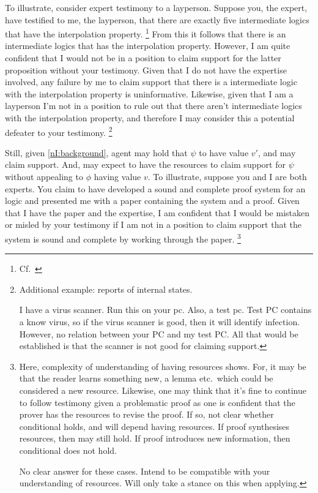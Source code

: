 \begin{note}
  To illustrate, consider expert testimony to a layperson.
  Suppose you, the expert, have testified to me, the layperson, that there are exactly five intermediate logics that have the interpolation property.\nolinebreak
  \footnote{Cf.\ \textcite{Maksimova:1977un}}
  From this it follows that there is an intermediate logics that has the interpolation property.
  However, I am quite confident that I would not be in a position to claim support for the latter proposition without your testimony.
  Given that I do not have the expertise involved, any failure by me to claim support that there is a intermediate logic with the interpolation property is uninformative.
  Likewise, given that I am a layperson I'm not in a position to rule out that there aren't intermediate logics with the interpolation property, and therefore I may consider this a potential defeater to your testimony.\nolinebreak
  \footnote{
    Additional example: reports of internal states.

    I have a virus scanner.
    Run this on your pc.
    Also, a test pc.
    Test PC contains a know virus, so if the virus scanner is good, then it will identify infection.
    However, no relation between your PC and my test PC.
    All that would be established is that the scanner is not good for claiming support.
    }

  Still, given \ref{nI:background}, agent may hold that \(\psi\) to have value \(v'\), and may claim support.
  And, may expect to have the resources to claim support for \(\psi\) without appealing to \(\phi\) having value \(v\).
  To illustrate, suppose you and I are both experts.
  You claim to have developed a sound and complete proof system for an logic and presented me with a paper containing the system and a proof.
  Given that I have the paper and the expertise, I am confident that I would be mistaken or misled by your testimony if I am not in a position to claim support that the system is sound and complete by working through the paper.\nolinebreak
  \footnote{
    Here, complexity of understanding of having resources shows.
    For, it may be that the reader learns something new, a lemma etc.\ which could be considered a new resource.
    Likewise, one may think that it's fine to continue to follow testimony given a problematic proof as one is confident that the prover has the resources to revise the proof.
    If so, not clear whether conditional holds, and will depend having resources.
    If proof synthesises resources, then may still hold.
    If proof introduces new information, then conditional does not hold.

    No clear answer for these cases.
    Intend to be compatible with your understanding of resources.
    Will only take a stance on this when applying.
  }
\end{note}

